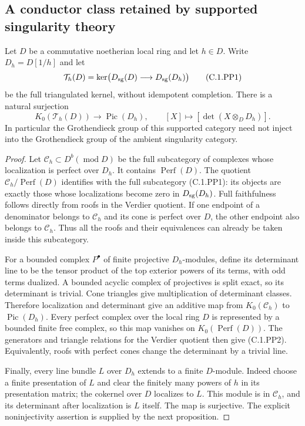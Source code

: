 \subsection{A conductor class retained by supported singularity theory}

\begin{lemma}
\label{C:supported-singularity-Picard-detector}
Let $D$ be a commutative noetherian local ring and let $h\in D$.
Write $D_h=D[1/h]$ and let
\[
 \mathcal T_h(D)=
 \ker\bigl(D_{\rm sg}(D)\longrightarrow D_{\rm sg}(D_h)\bigr)
                                                               \tag{C.1.PP1}
\]
be the full triangulated kernel, without idempotent completion.
There is a natural surjection
\[
 K_0(\mathcal T_h(D))\longrightarrow\operatorname{Pic}(D_h),
 \qquad [X]\longmapsto [\det(X\otimes_D D_h)].        \tag{C.1.PP2}
\]
In particular the Grothendieck group of this supported category
need not inject into the Grothendieck group of the ambient
singularity category.
\end{lemma}
\begin{proof}
Let $\mathcal C_h\subset D^b(\operatorname{mod}D)$ be the full
subcategory of complexes whose localization is perfect over $D_h$.
It contains $\operatorname{Perf}(D)$.
The quotient $\mathcal C_h/\operatorname{Perf}(D)$ identifies
with the full subcategory (C.1.PP1): its objects are exactly those
whose localizations become zero in $D_{\rm sg}(D_h)$.
Full faithfulness follows directly from roofs in the Verdier
quotient.  If one endpoint of a denominator belongs to
$\mathcal C_h$ and its cone is perfect over $D$, the other endpoint
also belongs to $\mathcal C_h$.  Thus all the roofs and their
equivalences can already be taken inside this subcategory.

For a bounded complex $P^\bullet$ of finite projective $D_h$-modules,
define its determinant line to be the tensor product of the top
exterior powers of its terms, with odd terms dualized.
A bounded acyclic complex of projectives is split exact, so its
determinant is trivial.  Cone triangles give multiplication of
determinant classes.  Therefore localization and determinant
give an additive map from $K_0(\mathcal C_h)$ to
$\operatorname{Pic}(D_h)$.
Every perfect complex over the local ring $D$ is represented by
a bounded finite free complex, so this map vanishes on
$K_0(\operatorname{Perf}(D))$.
The generators and triangle relations for the Verdier quotient
then give (C.1.PP2).  Equivalently, roofs with perfect cones change
the determinant by a trivial line.

Finally, every line bundle $L$ over $D_h$ extends to a finite
$D$-module.  Indeed choose a finite presentation of $L$ and clear
the finitely many powers of $h$ in its presentation matrix; the
cokernel over $D$ localizes to $L$.
This module is in $\mathcal C_h$, and its determinant after
localization is $L$ itself.  The map is surjective.
The explicit noninjectivity assertion is supplied by the next
proposition.
\end{proof}


